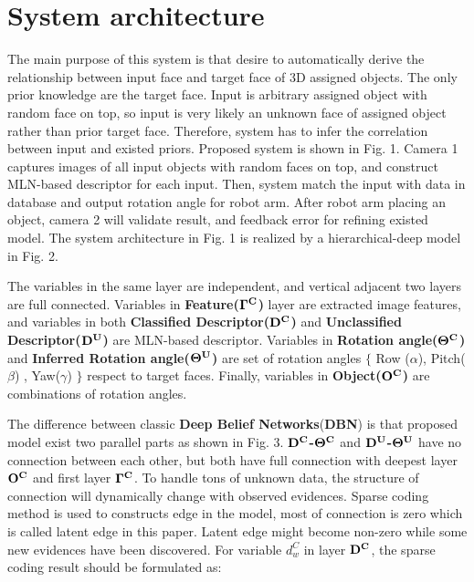 \documentclass[journal]{IEEEtran}
\begin{document}
\section{System architecture} 

The main purpose of this system is that desire to automatically derive the relationship between input face and target face of 3D assigned objects. The only prior knowledge are the target face. Input is arbitrary assigned object with random face on top, so input is very likely an unknown face of assigned object rather than prior target face. Therefore, system has to infer the correlation between input and existed priors.  Proposed system is shown in Fig. 1. Camera 1 captures images of all input objects with random faces on top, and construct MLN-based descriptor for each input. Then, system match the input with data in database and output rotation angle for robot arm. After robot arm placing an object, camera 2 will validate result, and feedback error for refining existed model. The system architecture in Fig. 1 is realized by a hierarchical-deep model in Fig. 2. 

The variables in the same layer are independent, and vertical adjacent two layers are full connected. Variables in \textbf{Feature($\bf{\Gamma^{C}}$)} layer are extracted image features, and variables in both \textbf{Classified Descriptor($\bf{D^C}$)} and \textbf{Unclassified Descriptor($\bf{D^U}$)} are MLN-based descriptor. Variables in \textbf{Rotation angle($\bf{\Theta^{C}}$)} and \textbf{Inferred Rotation angle($\bf{\Theta^U}$)} are set of rotation angles $\{$ Row ($\alpha$), Pitch($\beta$) , Yaw($\gamma$) $\}$ respect to target faces. Finally, variables in \textbf{Object($\bf{O^C}$)} are combinations of rotation angles.


The difference between classic \textbf{Deep Belief Networks}(\textbf{DBN}) is that proposed model exist two parallel parts as shown in Fig. 3. \textbf{$\bf{D^C}$-$\bf{\Theta^{C}}$} and \textbf{$\bf{D^U}$-$\bf{\Theta^U}$} have no connection between each other, but both have full connection with deepest layer $\bf{O^C}$ and first layer \textbf{$\bf{\Gamma^{C}}$}. To handle tons of unknown data, the structure of connection will dynamically change with observed evidences. Sparse coding method is used to constructs edge in the model, most of connection is zero which is called latent edge in this paper. Latent edge might become non-zero while some new evidences have been discovered. For variable $d^C_w$ in layer $\bf{D^C}$, the sparse coding result should be formulated as:
\end{document}
